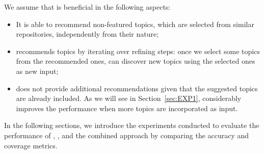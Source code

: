 

We assume that \TFb is beneficial in the following aspects:
\begin{itemize}
	\item It is able to recommend non-featured topics, which are selected from similar repositories, independently from their nature;
	\item \TFb recommends topics by iterating over refining steps: once we select some topics from the recommended ones, \TFb can discover new topics using the selected ones as new input;
	\item \MNB does not provide additional recommendations given that the suggested topics are already included. As we will see in Section~\ref{sec:EXP1}, \TFb considerably improves the performance when more topics are incorporated as input.
\end{itemize}

In the following sections, we introduce the experiments conducted to evaluate 
the performance of \TFa, \MNB, and the combined approach \TFb by comparing the 
accuracy and coverage 
metrics.

